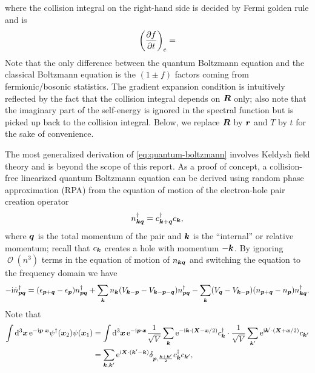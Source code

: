\documentclass[hyperref, a4paper]{article}
\newcommand*{\ii}{\mathrm{i}}
\newcommand*{\ee}{\mathrm{e}}
\DeclareMathOperator{\bigO}{\mathcal{O}}
\begin{document}
where the collision integral on the right-hand side is decided by Fermi golden rule 
and is 
\begin{equation}
    \left(\pdv{f}{t}\right)_{\text{c}} = 
\end{equation}
Note that the only difference between the quantum Boltzmann equation 
and the classical Boltzmann equation 
is the $(1 \pm f)$ factors coming from fermionic/bosonic statistics.
The gradient expansion condition is intuitively reflected 
by the fact that the collision integral depends on $\vb*{R}$ only;
also note that the imaginary part of the self-energy is ignored 
in the spectral function
but is picked up back to the collision integral.
Below, we replace $\vb*{R}$ by $\vb*{r}$ 
and $T$ by $t$
for the sake of convenience.

The most generalized derivation of \eqref{eq:quantum-boltzmann} 
involves Keldysh field theory 
\cite{RevModPhys.58.323}
and is beyond the scope of this report.
As a proof of concept,
a collision-free linearized quantum Boltzmann equation can be derived 
using random phase approximation (RPA) 
from the equation of motion of the electron-hole pair creation operator
\begin{equation}
    n_{\vb*{k} \vb*{q}}^\dagger = c^\dagger_{\vb*{k} + \vb*{q}} c_{\vb*{k}},
\end{equation}
where $\vb*{q}$ is the total momentum of the pair 
and $\vb*{k}$ is the ``internal'' or relative momentum;
recall that $c_{\vb*{k}}$ creates a hole with momentum $- \vb*{k}$.
By ignoring $\bigO(n^3)$ terms in the equation of motion of $n_{\vb*{k} \vb*{q}}$
and switching the equation to the frequency domain
we have \cite{pines2018theory}
\begin{equation}
    - \ii \dot{n}_{\vb*{p} \vb*{q}}^\dagger
    = (\epsilon_{\vb*{p} + \vb*{q}} - \epsilon_{\vb*{p}}) n^\dagger_{\vb*{p} \vb*{q}}
    + \sum_{\vb*{k}} n_{\vb*{k}} (V_{\vb*{k} - \vb*{p}} - V_{\vb*{k} - \vb*{p} - \vb*{q}}) n^\dagger_{\vb*{p} \vb*{q}}
    - \sum_{\vb*{k}} (V_{\vb*{q}} - V_{\vb*{k} - \vb*{p}})
    (n_{\vb*{p} + \vb*{q}} - n_{\vb*{p}})
    n^\dagger_{\vb*{k} \vb*{q}}.
    \label{eq:eom-density}
\end{equation}
Note that 
\begin{equation}
    \begin{aligned}
        \int \dd[3]{\vb*{x}} \ee^{- \ii \vb*{p} \cdot \vb*{x}} \psi^\dagger(\vb*{x}_2) \psi(\vb*{x}_1) 
        &= \int \dd[3]{\vb*{x}} \ee^{- \ii \vb*{p} \cdot \vb*{x}}
        \frac{1}{\sqrt{V}} \sum_{\vb*{k}} \ee^{- \ii \vb*{k} \cdot (\vb*{X} - \vb*{x} /2 )} c_{\vb*{k}}^\dagger
        \cdot \frac{1}{\sqrt{V}} \sum_{\vb*{k}'} \ee^{\ii \vb*{k}' \cdot (\vb*{X} + \vb*{x} / 2)} c_{\vb*{k}'} \\
        &= \sum_{\vb*{k}, \vb*{k}'} \ee^{\ii \vb*{X} \cdot (\vb*{k}' - \vb*{k})}
        \delta_{\vb*{p}, \frac{\vb*{k} + \vb*{k}'}{2}} c^\dagger_{\vb*{k}} c_{\vb*{k}'},
    \end{aligned}
\end{equation}
\end{document}
